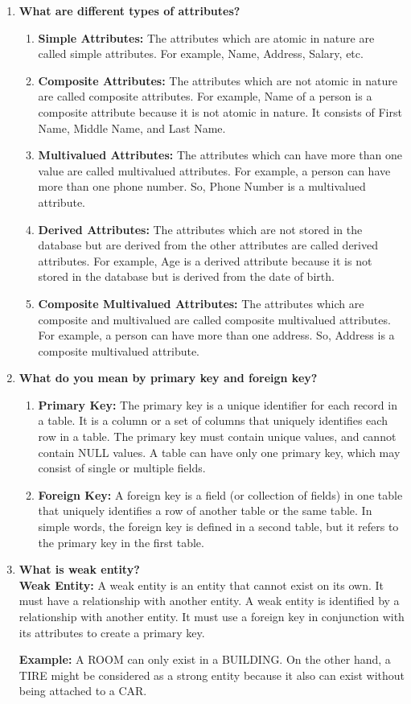 \documentclass[11pt]{article}
\begin{document}
\begin{enumerate}
	\item \textbf{What are different types of attributes?}

	      \begin{enumerate}
		      \item \textbf{Simple Attributes:} The attributes which are atomic in nature are called simple attributes. For example, Name, Address, Salary, etc.
		      \item \textbf{Composite Attributes:} The attributes which are not atomic in nature are called composite attributes. For example, Name of a person is a composite attribute because it is not atomic in nature. It consists of First Name, Middle Name, and Last Name.
		      \item \textbf{Multivalued Attributes:} The attributes which can have more than one value are called multivalued attributes. For example, a person can have more than one phone number. So, Phone Number is a multivalued attribute.
		      \item \textbf{Derived Attributes:} The attributes which are not stored in the database but are derived from the other attributes are called derived attributes. For example, Age is a derived attribute because it is not stored in the database but is derived from the date of birth.
		      \item \textbf{Composite Multivalued Attributes:} The attributes which are composite and multivalued are called composite multivalued attributes. For example, a person can have more than one address. So, Address is a composite multivalued attribute.
	      \end{enumerate}
	\item \textbf{What do you mean by primary key and foreign key?}

	      \begin{enumerate}
		      \item \textbf{Primary Key:} The primary key is a unique identifier for each record in a table. It is a column or a set of columns that uniquely identifies each row in a table. The primary key must contain unique values, and cannot contain NULL values. A table can have only one primary key, which may consist of single or multiple fields.
		      \item \textbf{Foreign Key:} A foreign key is a field (or collection of fields) in one table that uniquely identifies a row of another table or the same table. In simple words, the foreign key is defined in a second table, but it refers to the primary key in the first table.
	      \end{enumerate}
	\item \textbf{What is weak entity?}\\
	      \textbf{Weak Entity:} A weak entity is an entity that cannot exist on its own. It must have a relationship with another entity. A weak entity is identified by a relationship with another entity. It must use a foreign key in conjunction with its attributes to create a primary key.

	      \textbf{Example: }
	      A ROOM can only exist in a BUILDING. On the other hand, a TIRE might be considered as a strong entity because it also can exist without being attached to a CAR.
\end{enumerate}
\end{document}
